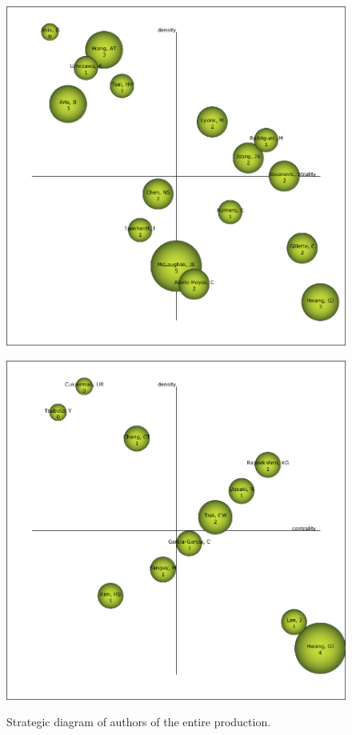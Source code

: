 \documentclass{textolivre-html}
\begin{document}
\begin{figure}[htbp]
 \begin{minipage}{.45\textwidth}
 \includegraphics[width=\textwidth]{Fig06a.png}
 \label{fig06a}
 \end{minipage}
 \hfill
 \begin{minipage}{.45\textwidth}
 \includegraphics[width=\textwidth]{Fig06b.png}
 \label{fig06b}
 \end{minipage}
 \caption{Strategic diagram of authors of the entire production.}
 \label{fig06}
\end{figure}
\end{document}
